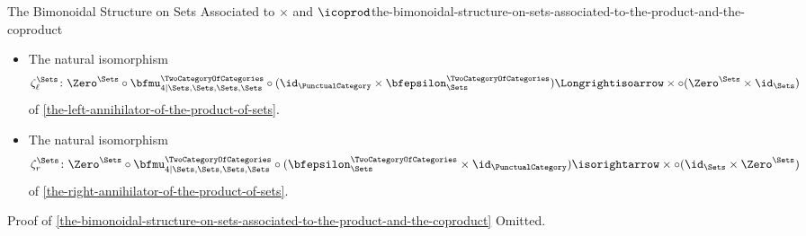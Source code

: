 \begin{proposition}{The Bimonoidal Structure on Sets Associated to $\times$ and $\icoprod$}{the-bimonoidal-structure-on-sets-associated-to-the-product-and-the-coproduct}
\begin{itemize}
        \item{}The natural isomorphism
            \[
                \zeta^{\Sets}_{\ell}
                \colon
                \Zero^{\Sets}\circ\bfmu^{\TwoCategoryOfCategories}_{4|\Sets,\Sets,\Sets,\Sets}\circ(\id_{\PunctualCategory}\times\bfepsilon^{\TwoCategoryOfCategories}_{\Sets})
                \Longrightisoarrow
                \times\circ(\Zero^{\Sets}\times\id_{\Sets})
            \]%
            of \cref{the-left-annihilator-of-the-product-of-sets}.
        \item{}The natural isomorphism
            \[
                \zeta^{\Sets}_{r}
                \colon
                \Zero^{\Sets}\circ\bfmu^{\TwoCategoryOfCategories}_{4|\Sets,\Sets,\Sets,\Sets}\circ(\bfepsilon^{\TwoCategoryOfCategories}_{\Sets}\times\id_{\PunctualCategory})
                \isorightarrow
                \times\circ(\id_{\Sets}\times\Zero^{\Sets})
            \]%
            of \cref{the-right-annihilator-of-the-product-of-sets}.
    \end{itemize}
\end{proposition}
\begin{Proof}{Proof of \cref{the-bimonoidal-structure-on-sets-associated-to-the-product-and-the-coproduct}}%
    Omitted.
\end{Proof}
\begin{appendices}

\end{appendices}

